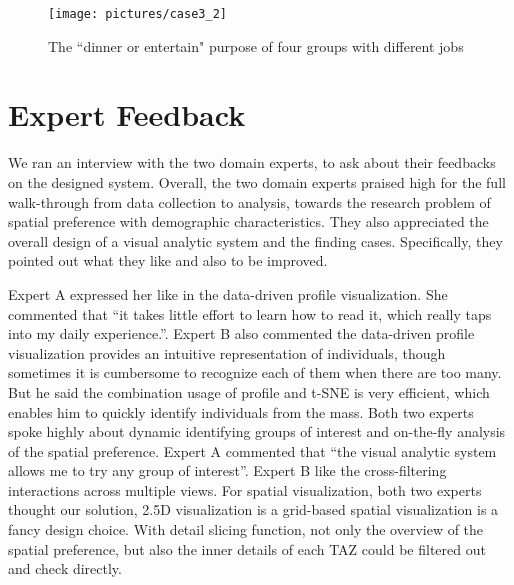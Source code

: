 \documentclass{ieeeaccess}
\begin{document}
\begin{figure}[htb!]
 \centering %
 \texttt{[image: pictures/case3\_2]}
 \caption{The ``dinner or entertain" purpose of four groups with different jobs}
 \label{case32}
\end{figure}




\section{Expert Feedback}

We ran an interview with the two domain experts, to ask about their feedbacks on the designed system. Overall, the two domain experts praised high for the full walk-through from data collection to analysis, towards the research problem of spatial preference with demographic characteristics. They also appreciated the overall design of a visual analytic system and the finding cases. Specifically, they pointed out what they like and also to be improved.

Expert A expressed her like in the data-driven profile visualization. She commented that ``it takes little effort to learn how to read it, which really taps into my daily experience.''. Expert B also commented the data-driven profile visualization provides an intuitive representation of individuals, though sometimes it is cumbersome to recognize each of them when there are too many. But he said the combination usage of profile and t-SNE is very efficient, which enables him to quickly identify individuals from the mass. Both two experts spoke highly about dynamic identifying groups of interest and on-the-fly analysis of the spatial preference. Expert A commented that ``the visual analytic system allows me to try any group of interest''. Expert B like the cross-filtering interactions across multiple views.  For spatial visualization, both two experts thought our solution, 2.5D visualization is a grid-based spatial visualization is a fancy design choice. With detail slicing function, not only the overview of the spatial preference, but also the inner details of each TAZ could be filtered out and check directly.
\end{document}
